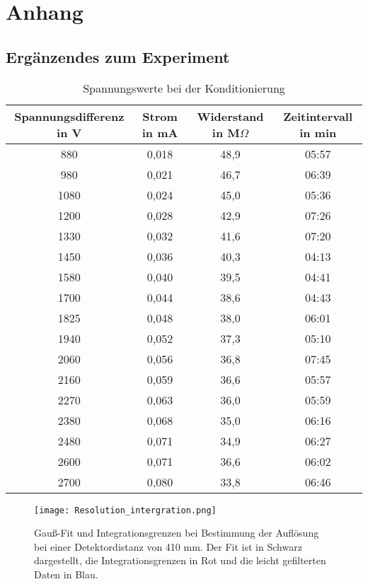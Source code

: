 \appendix
\chapter[]{Anhang}
\section{Ergänzendes zum Experiment}
\begin{table}[H]
    \caption{Spannungswerte bei der Konditionierung}
    \label{tab:Konditionierung}
    \begin{tabular}{cccc}
        Spannungsdifferenz in V & Strom in mA &	Widerstand in M$\Omega$ & Zeitintervall in min\\   
        \midrule
            880  & 0,018 & 48,9 & 05:57\\
            980  & 0,021 & 46,7 & 06:39\\
            1080 & 0,024 & 45,0 & 05:36\\
            1200 & 0,028 & 42,9 & 07:26\\
            1330 & 0,032 & 41,6 & 07:20\\
            1450 & 0,036 & 40,3 & 04:13\\
            1580 & 0,040 & 39,5 & 04:41\\
            1700 & 0,044 & 38,6 & 04:43\\
            1825 & 0,048 & 38,0 & 06:01\\
            1940 & 0,052 & 37,3 & 05:10\\
            2060 & 0,056 & 36,8 & 07:45\\
            2160 & 0,059 & 36,6 & 05:57\\
            2270 & 0,063 & 36,0 & 05:59\\
            2380 & 0,068 & 35,0 & 06:16\\
            2480 & 0,071 & 34,9 & 06:27\\
            2600 & 0,071 & 36,6 & 06:02\\
            2700 & 0,080 & 33,8 & 06:46\\      
    \end{tabular}
\end{table}

\begin{landscape}
    \begin{figure}[H]
        \centering
        \hspace{-4cm}\texttt{[image: Resolution\_intergration.png]}
        \caption[Gauß-Fit und Integrationsgrenzen bei Bestimmung der Auflösung]{Gauß-Fit und Integrationsgrenzen bei Bestimmung der Auflösung bei einer Detektordistanz von 410 mm. Der Fit ist in Schwarz dargestellt, die Integrationsgrenzen in Rot und die leicht gefilterten Daten in Blau.}
        \label{fig:integrationsgrenzen}
    \end{figure}
\end{landscape}

